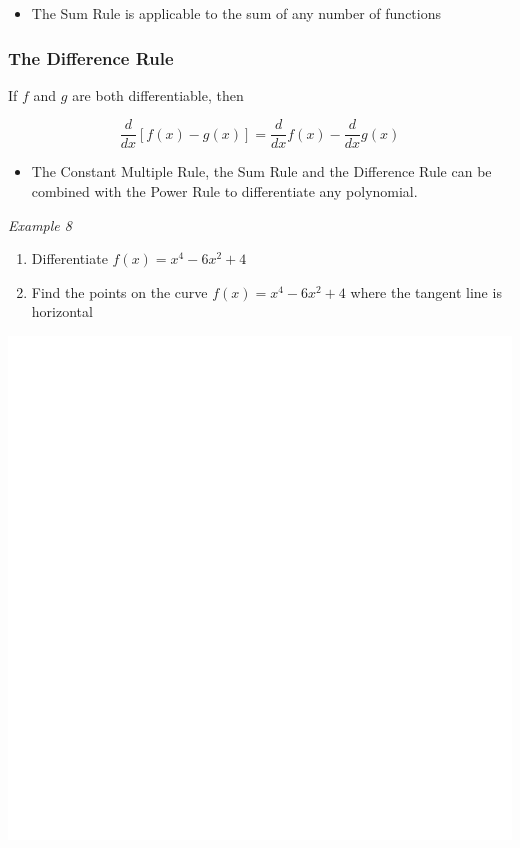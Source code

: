 \documentclass[]{book}
\providecommand{\tightlist}{%
  \setlength{\itemsep}{0pt}\setlength{\parskip}{0pt}}
\begin{document}
\begin{itemize}
\tightlist
\item
  The Sum Rule is applicable to the sum of any number of functions
\end{itemize}

\vspace{6pt}

\hypertarget{the-difference-rule}{%
\subsubsection{The Difference Rule}\label{the-difference-rule}}

If \(f\) and \(g\) are both differentiable, then

\[\frac{d}{dx}[f(x)-g(x)]= \frac{d}{dx}f(x)- \frac{d}{dx}g(x)\]

\begin{itemize}
\tightlist
\item
  The Constant Multiple Rule, the Sum Rule and the Difference Rule can be combined with the Power Rule to differentiate any polynomial.
\end{itemize}

\newpage

\emph{Example 8}

\begin{enumerate}
\def\labelenumi{\alph{enumi})}
\item
  Differentiate \(f(x)=x^4 - 6x^2+4\)
\item
  Find the points on the curve \(f(x)=x^4-6x^2+4\) where the tangent line is horizontal
\end{enumerate}

\begin{center}\includegraphics[width=1\linewidth]{figure/LB13-1} \end{center}
\end{document}
